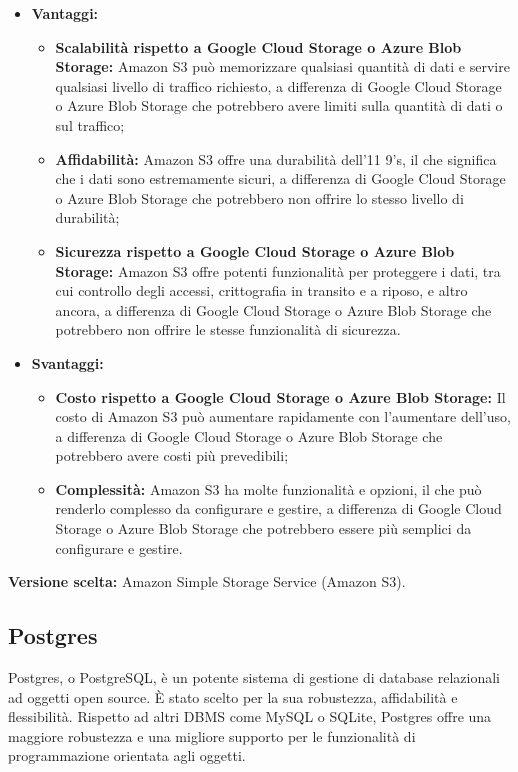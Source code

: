 \documentclass[10pt, a4paper]{article}
\begin{document}
\begin{itemize}
\item \textbf{Vantaggi:}
\begin{itemize}
\item \textbf{Scalabilità rispetto a Google Cloud Storage o Azure Blob Storage:} Amazon S3 può memorizzare qualsiasi quantità di dati e servire qualsiasi livello di traffico richiesto, a differenza di Google Cloud Storage o Azure Blob Storage che potrebbero avere limiti sulla quantità di dati o sul traffico;
\item \textbf{Affidabilità:} Amazon S3 offre una durabilità dell'11 9's, il che significa che i dati sono estremamente sicuri, a differenza di Google Cloud Storage o Azure Blob Storage che potrebbero non offrire lo stesso livello di durabilità;
\item \textbf{Sicurezza rispetto a Google Cloud Storage o Azure Blob Storage:} Amazon S3 offre potenti funzionalità per proteggere i dati, tra cui controllo degli accessi, crittografia in transito e a riposo, e altro ancora, a differenza di Google Cloud Storage o Azure Blob Storage che potrebbero non offrire le stesse funzionalità di sicurezza.
\end{itemize}
\item \textbf{Svantaggi:}
\begin{itemize}
\item \textbf{Costo rispetto a Google Cloud Storage o Azure Blob Storage:} Il costo di Amazon S3 può aumentare rapidamente con l'aumentare dell'uso, a differenza di Google Cloud Storage o Azure Blob Storage che potrebbero avere costi più prevedibili;
\item \textbf{Complessità:} Amazon S3 ha molte funzionalità e opzioni, il che può renderlo complesso da configurare e gestire, a differenza di Google Cloud Storage o Azure Blob Storage che potrebbero essere più semplici da configurare e gestire.
\end{itemize}
\end{itemize}
\textbf{Versione scelta:} Amazon Simple Storage Service (Amazon S3).

\subsection{Postgres}
Postgres, o PostgreSQL, è un potente sistema di gestione di database relazionali ad oggetti open source. È stato scelto per la sua robustezza, affidabilità e flessibilità. Rispetto ad altri DBMS come MySQL o SQLite, Postgres offre una maggiore robustezza e una migliore supporto per le funzionalità di programmazione orientata agli oggetti.
\end{document}
